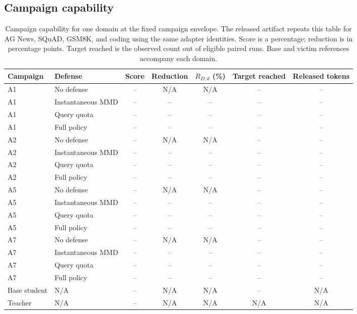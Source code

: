 \documentclass[journal]{IEEEtran}
\newcommand{\pending}{\textcolor{red!65!black}{--}}
\begin{document}
\subsection{Campaign capability}
\label{sec:res-capability}
\begin{table}[!t]
\centering\footnotesize
\caption{Campaign capability for one domain at the fixed campaign envelope. The released artifact repeats this table for AG News, SQuAD, GSM8K, and coding using the same adapter identities. Score is a percentage; reduction is in percentage points. Target reached is the observed count out of eligible paired runs. Base and victim references accompany each domain.}
\label{tab:student}
\begin{tabularx}{\textwidth}{@{}lYccccc@{}}\toprule
Campaign & Defense & Score & Reduction & $R_{D,d}$ (\%) & Target reached & Released tokens \\\midrule
A1 & No defense & \pending & N/A & N/A & \pending & \pending \\
A1 & Instantaneous MMD & \pending & \pending & \pending & \pending & \pending \\
A1 & Query quota & \pending & \pending & \pending & \pending & \pending \\
A1 & Full policy & \pending & \pending & \pending & \pending & \pending \\
A2 & No defense & \pending & N/A & N/A & \pending & \pending \\
A2 & Instantaneous MMD & \pending & \pending & \pending & \pending & \pending \\
A2 & Query quota & \pending & \pending & \pending & \pending & \pending \\
A2 & Full policy & \pending & \pending & \pending & \pending & \pending \\
A5 & No defense & \pending & N/A & N/A & \pending & \pending \\
A5 & Instantaneous MMD & \pending & \pending & \pending & \pending & \pending \\
A5 & Query quota & \pending & \pending & \pending & \pending & \pending \\
A5 & Full policy & \pending & \pending & \pending & \pending & \pending \\\midrule
A7 & No defense & \pending & N/A & N/A & \pending & \pending \\
A7 & Instantaneous MMD & \pending & \pending & \pending & \pending & \pending \\
A7 & Query quota & \pending & \pending & \pending & \pending & \pending \\
A7 & Full policy & \pending & \pending & \pending & \pending & \pending \\\midrule
Base student & N/A & \pending & N/A & N/A & \pending & N/A \\
Teacher & N/A & \pending & N/A & N/A & N/A & N/A \\\bottomrule
\end{tabularx}
\end{table}
\end{document}
